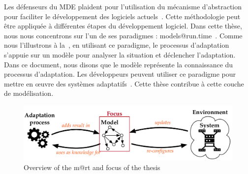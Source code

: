 Les défenseurs du MDE plaident pour l'utilisation du mécanisme d'abstraction pour faciliter le développement des logiciels actuels~\cite{DBLP:journals/computer/Schmidt06, DBLP:conf/ifm/Kent02, DBLP:series/synthesis/2017Brambilla}. 
Cette méthodologie peut être appliquée à différentes étapes du développement logiciel. 
Dans cette thèse, nous nous concentrons sur l'un de ses paradigmes : models@run.time~\cite{DBLP:journals/computer/BlairBF09, DBLP:journals/computer/MorinBJFS09}. 
Comme nous l'illustrons à la~, en utilisant ce paradigme, le processus d'adaptation s'appuie sur un modèle pour analyser la situation et déclencher l'adaptation. 
Dans ce document, nous disons que le modèle représente la connaissance du processus d'adaptation. 
Les développeurs peuvent utiliser ce paradigme pour mettre en œuvre des systèmes adaptatifs~\cite{DBLP:journals/computer/MorinBJFS09, DBLP:conf/smartgridsec/0001FKNT14}.
Cette thèse contribue à cette couche de modélisation.




\begin{figure}
	\centering
	\includegraphics[width=.9\linewidth]{img/chapt-intro/context/mart-focus}
	\caption{Overview of the \gls{m@rt} and focus of the thesis}
	\label{fig:french:context:m@rt}
\end{figure}
